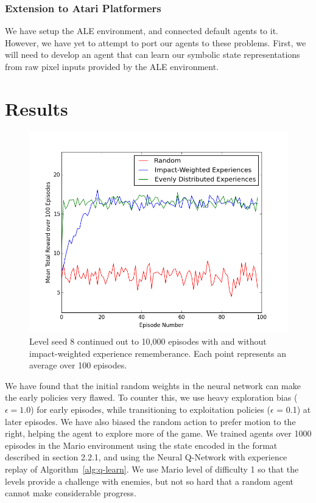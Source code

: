 \documentclass{article}
\begin{document}
\subsubsection{Extension to Atari Platformers}
We have setup the ALE environment, and connected default agents to it. However, we have yet to attempt to port our agents to these problems. First, we will need to develop an agent that can learn our symbolic state representations from raw pixel inputs provided by the ALE environment.
 
 \section{Results}
 
 \begin{figure}
\begin{center}
\includegraphics[scale=0.42]{10000epsSeed8.png}
\caption{Level seed 8 continued out to 10,000 episodes with and without impact-weighted experience rememberance. Each point represents an average over 100 episodes.}
\end{center}
\end{figure}
 
We have found that the initial random weights in the neural network can make the early policies very flawed. To counter this, we use heavy exploration bias ($\epsilon = 1.0$) for early episodes, while transitioning to exploitation policies ($\epsilon$ = 0.1) at later episodes. We have also biased the random action to prefer motion to the right, helping the agent to explore more of the game. We trained agents over 1000 episodes in the Mario environment using the state encoded in the format described in section 2.2.1, and using the Neural Q-Network with experience replay of Algorithm~\ref{alg:q-learn}. We use Mario level of difficulty 1 so that the levels provide a challenge with enemies, but not so hard that a random agent cannot make considerable progress.
 
\end{document}
